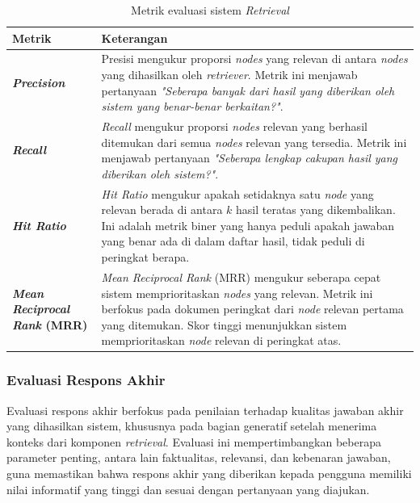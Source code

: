 \begin{table}[H]
	\centering
	\caption{Metrik evaluasi sistem \textit{Retrieval} }
	\label{tab:retrieval-evaluation-metrics}
	\begin{tabular}{|p{}|p{}|}
		\hline
		\textbf{Metrik}                              & \textbf{Keterangan}                                                                                                                                                                                                                                    \\
		\hline
		\textbf{\textit{Precision}}                  &
		Presisi mengukur proporsi \textit{nodes} yang relevan di antara \textit{nodes} yang dihasilkan oleh \textit{retriever}. Metrik ini menjawab pertanyaan \textit{"Seberapa banyak dari hasil yang diberikan oleh sistem yang benar-benar berkaitan?"}.                                                  \\
		\hline
		\textbf{\textit{Recall}}                     &
		\textit{Recall} mengukur proporsi \textit{nodes} relevan yang berhasil ditemukan dari semua \textit{nodes} relevan yang tersedia. Metrik ini menjawab pertanyaan \textit{"Seberapa lengkap cakupan hasil yang diberikan oleh sistem?"}.                                                               \\
		\hline
		\textbf{\textit{Hit Ratio}}                  &
		\textit{Hit Ratio} mengukur apakah setidaknya satu \textit{node} yang relevan berada di antara $k$ hasil teratas yang dikembalikan. Ini adalah metrik biner yang hanya peduli apakah jawaban yang benar ada di dalam daftar hasil, tidak peduli di peringkat berapa.                                  \\
		\hline
		\textbf{\textit{Mean Reciprocal Rank} (MRR)} &
		\textit{Mean Reciprocal Rank} (MRR) mengukur seberapa cepat sistem memprioritaskan \textit{nodes} yang relevan. Metrik ini berfokus pada dokumen peringkat dari \textit{node} relevan pertama yang ditemukan. Skor tinggi menunjukkan sistem memprioritaskan \textit{node} relevan di peringkat atas. \\
		\hline
	\end{tabular}
\end{table}

\subsubsection{Evaluasi Respons Akhir}
Evaluasi respons akhir berfokus pada penilaian terhadap kualitas jawaban akhir yang dihasilkan sistem, khususnya pada bagian generatif setelah menerima konteks dari komponen \textit{retrieval}.
Evaluasi ini mempertimbangkan beberapa parameter penting, antara lain faktualitas, relevansi, dan kebenaran jawaban, guna memastikan bahwa respons akhir yang diberikan kepada pengguna memiliki nilai informatif yang tinggi dan sesuai dengan pertanyaan yang diajukan.

